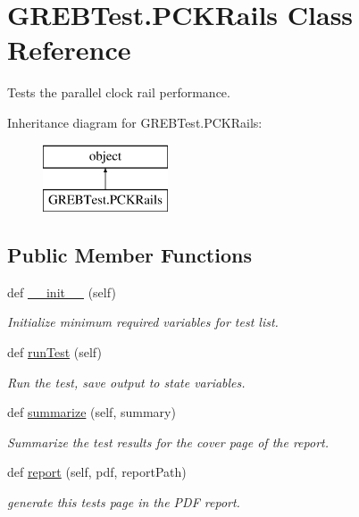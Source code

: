 \hypertarget{class_g_r_e_b_test_1_1_p_c_k_rails}{}\section{G\+R\+E\+B\+Test.\+P\+C\+K\+Rails Class Reference}
\label{class_g_r_e_b_test_1_1_p_c_k_rails}


Tests the parallel clock rail performance.  


Inheritance diagram for G\+R\+E\+B\+Test.\+P\+C\+K\+Rails\+:\begin{figure}[H]
\begin{center}
\leavevmode
\includegraphics[height=2.000000cm]{class_g_r_e_b_test_1_1_p_c_k_rails}
\end{center}
\end{figure}
\subsection*{Public Member Functions}
\begin{DoxyCompactItemize}
\item 
def \hyperlink{class_g_r_e_b_test_1_1_p_c_k_rails_a00b31975b5faca18c8be81b21b0ba741}{\+\_\+\+\_\+init\+\_\+\+\_\+} (self)
\begin{DoxyCompactList}\small\item\em Initialize minimum required variables for test list. \end{DoxyCompactList}\item 
def \hyperlink{class_g_r_e_b_test_1_1_p_c_k_rails_a88eadd5557a36e319f6b45924573c741}{run\+Test} (self)
\begin{DoxyCompactList}\small\item\em Run the test, save output to state variables. \end{DoxyCompactList}\item 
def \hyperlink{class_g_r_e_b_test_1_1_p_c_k_rails_a277a4fe1cbbd534b76206edd189e89a2}{summarize} (self, summary)
\begin{DoxyCompactList}\small\item\em Summarize the test results for the cover page of the report. \end{DoxyCompactList}\item 
def \hyperlink{class_g_r_e_b_test_1_1_p_c_k_rails_ae1f03dd0cd9709f339fecd9004be7843}{report} (self, pdf, report\+Path)
\begin{DoxyCompactList}\small\item\em generate this test\textquotesingle{}s page in the P\+DF report. \end{DoxyCompactList}\end{DoxyCompactItemize}



